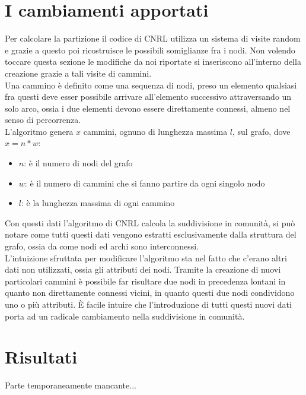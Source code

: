 \section{I cambiamenti apportati}
Per calcolare la partizione il codice di CNRL utilizza un sistema di visite random e grazie a questo poi ricostruisce le possibili somiglianze fra i nodi. Non volendo toccare questa sezione le modifiche da noi riportate si inseriscono all'interno della creazione grazie a tali visite di cammini.\\
Una cammino è definito come una sequenza di nodi, preso un elemento qualsiasi fra questi deve esser possibile arrivare all'elemento successivo attraversando un solo arco, ossia i due elementi devono essere direttamente connessi, almeno nel senso di percorrenza.\\
L'algoritmo genera $x$ cammini, ognuno di lunghezza massima $l$, sul grafo, dove $x=n*w$:
\begin{itemize}
	\item $n$: è il numero di nodi del grafo
	\item $w$: è il numero di cammini che si fanno partire da ogni singolo nodo
	\item $l$: è la lunghezza massima di ogni cammino
\end{itemize}
%
Con questi dati l'algoritmo di CNRL calcola la suddivisione in comunità, si può notare come tutti questi dati vengono estratti esclusivamente dalla struttura del grafo, ossia da come nodi ed archi sono interconnessi.\\
L'intuizione sfruttata per modificare l'algoritmo sta nel fatto che c'erano altri dati non utilizzati, ossia gli attributi dei nodi. Tramite la creazione di nuovi particolari cammini è possibile far risultare due nodi in precedenza lontani in quanto non direttamente connessi vicini, in quanto questi due nodi condividono uno o più attributi. È facile intuire che l'introduzione di tutti questi nuovi dati porta ad un radicale cambiamento nella suddivisione in comunità.
%
\section{Risultati}
Parte temporaneamente mancante...

%
%
%
%
\newpage
%
